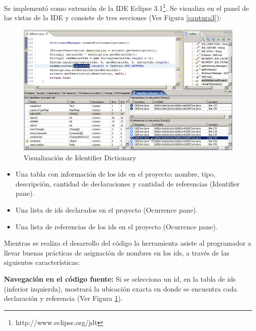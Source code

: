Se implementó como extensión de la IDE Eclipse 3.1\footnote[2]{http://www.eclipse.org/jdt}. Se visualiza en el panel de las vistas de la IDE y consiste de tres secciones (Ver Figura \ref{captura3}):

\begin{figure}[t] %
\centerline{%
\includegraphics[scale= 0.50]{./cap3/idd_3.png}
}
\caption{Visualización de Identifier Dictionary}
\label{captura4}
\end{figure} 

\begin{itemize}
\itemsep0em%
\item Una tabla con información de los ids en el proyecto: nombre, tipo, descripción, cantidad de declaraciones y cantidad de referencias (Identifier pane).
\item Una lista de ids declarados en el proyecto (Ocurrence pane).
\item Una lista de referencias de los ids en el proyecto (Ocurrence pane).
\end{itemize}

Mientras se realiza el desarrollo del código la herramienta asiste al programador a llevar buenas prácticas de asignación de nombres en los ids, a través de las siguientes características:

\textbf{Navegación en el código fuente:} Si se selecciona un id, en la tabla de ids (inferior izquierda), mostrará la ubicación exacta en donde se encuentra cada declaración y referencia (Ver Figura \ref{captura4}).

%

